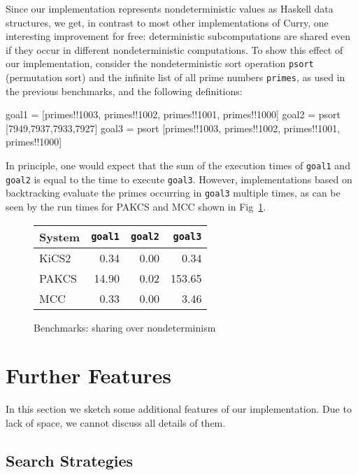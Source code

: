 \documentclass{llncs}
\newcommand{\code}[1]{\mbox{\small\texttt{#1}}}
\begin{document}
Since our implementation represents nondeterministic values
as Haskell data structures, we get, in contrast to most
other implementations of Curry, one interesting improvement for free:
deterministic subcomputations are shared even if they occur
in different nondeterministic computations.
To show this effect of our implementation, consider the
nondeterministic sort operation \code{psort} (permutation sort)
and the infinite list of all prime numbers \code{primes},
as used in the previous benchmarks, and the following definitions:
\begin{curry}
 goal1 = [primes!!1003, primes!!1002, primes!!1001, primes!!1000]
 goal2 = psort [7949,7937,7933,7927]
 goal3 = psort [primes!!1003, primes!!1002, primes!!1001, primes!!1000]
\end{curry}
In principle, one would expect that the sum of the execution times
of \code{goal1} and \code{goal2} is equal to the time to execute
\code{goal3}. However, implementations based on backtracking
evaluate the primes occurring in \code{goal3} multiple times,
as can be seen by the run times for PAKCS and MCC shown
in Fig~\ref{fig:bench-sharing-over-nondet}.
%
\begin{figure}
\centering
\begin{tabular}{|@{~~}l@{~~}|*{3}{@{~~}r@{~~}|}}
\hline
System  & \code{goal1} & \code{goal2} & \code{goal3} \\\hline
KiCS2   &        0.34  &        0.00  &        0.34  \\
PAKCS   &       14.90  &        0.02  &      153.65  \\
MCC     &        0.33  &        0.00  &        3.46  \\
\hline
\end{tabular}
\caption{Benchmarks: sharing over nondeterminism}
 \label{fig:bench-sharing-over-nondet}
\end{figure}


\section{Further Features}
\label{sec:FurtherAspects}

In this section we sketch some additional features of our implementation.
Due to lack of space, we cannot discuss all details of them.

\subsection{Search Strategies}
\end{document}
